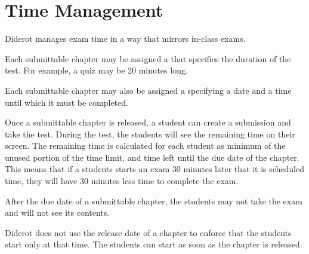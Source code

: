 \section{Time Management}
\label{ch:quiz::time-management}

\begin{cluster}
\label{grp:grm:quiz::manages}

\begin{gram}
\label{grm:quiz::manages}
Diderot manages exam time in a way that mirrors in-class exams.

\end{gram}
\end{cluster}

\begin{cluster}
\label{grp:grm:quiz::time-limit-and-due-date}

\begin{gram}
\label{grm:quiz::time-limit-and-due-date}
Each submittable chapter may be assigned a  that
specifies the duration of the test.  For example, a quiz may be 20
minutes long.

Each submittable chapter may also be assigned a  specifying a date and a time until which it must be completed. 

\end{gram}
\end{cluster}

\begin{cluster}
\label{grp:grm:quiz::taking-the-exam}

\begin{gram}
\label{grm:quiz::taking-the-exam}
Once a submittable chapter is released, a student can create a submission and take the test.  During the test, the students will see the remaining time on their screen.  The remaining time is calculated for each student as minimum of the unused portion of the time limit, and time left until the due date of the chapter.  This means that if a students starts an exam 30 minutes later that it is scheduled time, they will have 30 minutes less time to complete the exam.

After the due date of a submittable chapter, the students may not take the exam and will not see its contents.

Diderot does not use the release date of a chapter to enforce that the students start only at that time.  The students can start as soon as the chapter is released.

\end{gram}
\end{cluster}

